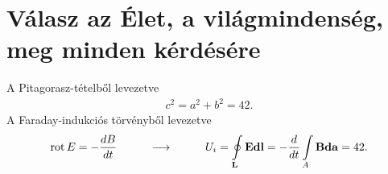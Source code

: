 \begin{lstlisting}[caption={TODO},language=bash,label=appendix:YAML]

\end{lstlisting}

\begin{lstlisting}[caption={TODO},language=bash,label=appendix:YAML]

\end{lstlisting}

\clearpage\section{Válasz az Élet, a világmindenség, meg minden kérdésére}
A Pitagorasz-tételből levezetve
\begin{align}
c^2=a^2+b^2=42.
\end{align}
A Faraday-indukciós törvényből levezetve
\begin{align}
\operatorname{rot} E=-\frac{dB}{dt}\hspace{1cm}\longrightarrow \hspace{1cm}
U_i=\oint\limits_\mathbf{L}{\mathbf{E}\mathbf{dl}}=-\frac{d}{dt}\int\limits_A{\mathbf{B}\mathbf{da}}=42.
\end{align}
